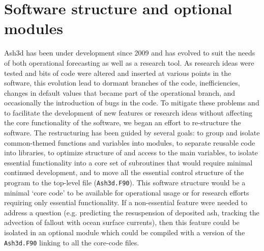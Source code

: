 \chapter{Software structure and optional modules}\label{ChapSoftwareStructure}
Ash3d has been under development since 2009 and has evolved to suit
the needs of both operational forecasting as well as a research tool.
As research ideas were tested and bits of code were altered and inserted
at various points in the software, this evolution lead to dormant
branches of the code, inefficiencies, changes in default values that became
part of the operational branch, and occasionally the introduction of 
bugs in the code.  To mitigate these problems and to facilitate the
development of new features or research ideas without affecting the core
functionality of the software, we began an effort to re-structure the
software.  The restructuring has been guided by several goals:
to group and isolate common-themed functions and variables into modules,
to separate reusable code into libraries,
to optimize structure of and access to the main variables,
to isolate essential functionality into a core set of subroutines that
would require minimal continued development, and
to move all the essential control structure of the program to 
the top-level file (\texttt{Ash3d.F90}).
This software structure would be a minimal `core code' to be available for
operational usage or for research efforts requiring only essential functionality.
If a non-essential feature were needed to address a question (e.g. predicting
the resuspension of deposited ash, tracking the advection of fallout with
ocean surface currents), then this feature could be isolated in an optional
module which could be compiled with a version of the \texttt{Ash3d.F90} linking
to all the core-code files.

